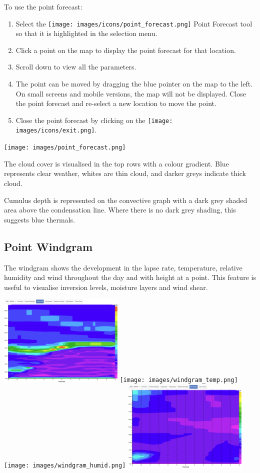 \documentclass[11pt,a4paper]{article}
\begin{document}
To use the point forecast:
\begin{enumerate}
\item Select the \texttt{[image: images/icons/point\_forecast.png]} Point Forecast tool so that it is highlighted in the selection menu.
\item Click a point on the map to display the point forecast for that location.
\item Scroll down to view all the parameters.
\item The point can be moved by dragging the blue pointer on the map to the left. On small screens and mobile versions, the map will not be displayed. Close the point forecast and re-select a new location to move the point.
\item Close the point forecast by clicking on the \texttt{[image: images/icons/exit.png]}.
\end{enumerate}
\begin{center}
\texttt{[image: images/point\_forecast.png]}
\end{center}
The cloud cover is visualised in the top rows with a colour gradient. Blue represents clear weather, whites are thin cloud, and darker greys indicate thick cloud.

Cumulus depth is represented on the convective graph with a dark grey shaded area above the condensation line. Where there is no dark grey shading, this suggests blue thermals.

\subsection{Point Windgram}
The windgram shows the development in the lapse rate, temperature, relative humidity and wind throughout the day and with height at a point. This feature is useful to visualise inversion levels, moisture layers and wind shear.
\begin{center}
\includegraphics[width=6cm]{images/windgram_lapse.png}
\texttt{[image: images/windgram\_temp.png]}\\
\texttt{[image: images/windgram\_humid.png]}
\includegraphics[width=6cm]{images/windgram_wind.png}
\end{center}
\end{document}
